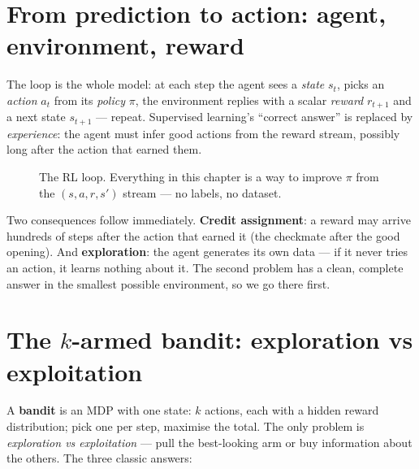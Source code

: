 \section{From prediction to action: agent, environment, reward}
\label{sec:loop}

The loop is the whole model: at each step the agent sees a
\emph{state} $s_t$, picks an \emph{action} $a_t$ from its
\emph{policy} $\pi$, the environment replies with a
scalar \emph{reward} $r_{t+1}$ and a next state
$s_{t+1}$ --- repeat. Supervised learning's ``correct answer'' is
replaced by \emph{experience}: the agent must infer good actions from
the reward stream, possibly long after the action that earned them.

\begin{figure}[htbp]
\centering
{}
\caption{The RL loop. Everything in this chapter is a way to improve
$\pi$ from the $(s,a,r,s')$ stream --- no labels, no dataset.}
\label{fig:loop}
\end{figure}

Two consequences follow immediately. \textbf{Credit assignment}: a
reward may arrive hundreds of steps after the action that earned it
(the checkmate after the good opening). And \textbf{exploration}: the
agent generates its own data --- if it never tries an action, it
learns nothing about it. The second problem has a clean, complete
answer in the smallest possible environment, so we go there first.

\section{The $k$-armed bandit: exploration vs exploitation}
\label{sec:bandits}

A \textbf{bandit} is an MDP with one state: $k$ actions,
each with a hidden reward distribution; pick one per step, maximise
the total. The only problem is \emph{exploration vs
exploitation} --- pull the best-looking arm or buy
information about the others. The three classic answers:


